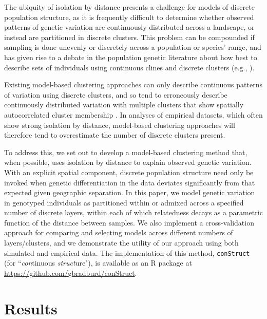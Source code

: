 \documentclass[10pt,letterpaper]{article}
\begin{document}
The ubiquity of isolation by distance presents a challenge for models of discrete population structure,
as it is frequently difficult to determine whether observed patterns of genetic variation are 
continuously distributed across a landscape, or instead are partitioned in discrete clusters.
This problem can be compounded if sampling is done unevenly or discretely across a population or species' range,
and has given rise to a debate in the population genetic literature
about how best to describe sets of individuals using continuous clines and discrete clusters 
(e.g., \cite{SerrePaabo2004,rosenberg2005clines}).

Existing model-based clustering approaches can only describe continuous patterns of variation using
discrete clusters, and so tend to erroneously describe continuously distributed variation with multiple clusters that 
show spatially autocorrelated cluster membership \cite{Frantz2009,meirmans2012}.
In analyses of empirical datasets, which often show strong isolation by distance,
model-based clustering approaches will therefore tend to overestimate
the number of discrete clusters present. 

To address this, we set out to develop
a model-based clustering method that, when possible, uses isolation by distance 
to explain observed genetic variation.
With an explicit spatial component, discrete population structure need only be invoked when genetic differentiation 
in the data deviates significantly from that expected given geographic separation.
In this paper, 
we model genetic variation in genotyped individuals as 
partitioned within or admixed across a specified number of discrete layers,
within each of which relatedness decays as a parametric function of the distance between samples.
We also implement a cross-validation approach for comparing and selecting models across different numbers of layers/clusters,
and we demonstrate the utility of our approach using both simulated and empirical data.
The implementation of this method, \texttt{conStruct} (for ``\emph{con}tinuous \emph{struct}ure"), 
is available as an R package at 
\href{https://github.com/gbradburd/conStruct}{https://github.com/gbradburd/conStruct}.

\section*{Results}
\end{document}
